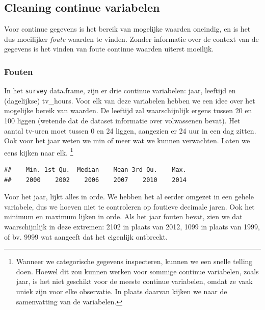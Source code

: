 \documentclass[]{tufte-book}
\newenvironment{Shaded}{}{}
\newcommand{\FunctionTok}[1]{\textcolor[rgb]{0.02,0.16,0.49}{#1}}
\newcommand{\NormalTok}[1]{#1}
\newcommand{\SpecialCharTok}[1]{\textcolor[rgb]{0.25,0.44,0.63}{#1}}
\begin{document}
\hypertarget{cleaning-continue-variabelen}{%
\subsection{Cleaning continue variabelen}\label{cleaning-continue-variabelen}}

Voor continue gegevens is het bereik van mogelijke waarden oneindig, en is het dus moeilijker \emph{foute} waarden te vinden. Zonder informatie over de context van de gegevens is het vinden van foute continue waarden uiterst moeilijk.

\hypertarget{fouten}{%
\subsubsection{Fouten}\label{fouten}}

In het \texttt{survey} data.frame, zijn er drie continue variabelen: jaar, leeftijd en (dagelijkse) tv\_hours. Voor elk van deze variabelen hebben we een idee over het mogelijke bereik van waarden. De leeftijd zal waarschijnlijk ergens tussen 20 en 100 liggen (wetende dat de dataset informatie over volwassenen bevat). Het aantal tv-uren moet tussen 0 en 24 liggen, aangezien er 24 uur in een dag zitten. Ook voor het jaar weten we min of meer wat we kunnen verwachten. Laten we eens kijken naar elk. \footnote{Wanneer we categorische gegevens inspecteren, kunnen we een snelle telling doen. Hoewel dit zou kunnen werken voor sommige continue variabelen, zoals jaar, is het niet geschikt voor de meeste continue variabelen, omdat ze vaak uniek zijn voor elke observatie. In plaats daarvan kijken we naar de samenvatting van de variabelen.}

\begin{Shaded}
\end{Shaded}

\begin{verbatim}
##    Min. 1st Qu.  Median    Mean 3rd Qu.    Max. 
##    2000    2002    2006    2007    2010    2014
\end{verbatim}

Voor het jaar, lijkt alles in orde. We hebben het al eerder omgezet in een gehele variabele, dus we hoeven niet te controleren op foutieve decimale jaren. Ook het minimum en maximum lijken in orde. Als het jaar fouten bevat, zien we dat waarschijnlijk in deze extremen: 2102 in plaats van 2012, 1099 in plaats van 1999, of bv. 9999 wat aangeeft dat het eigenlijk ontbreekt.
\end{document}
